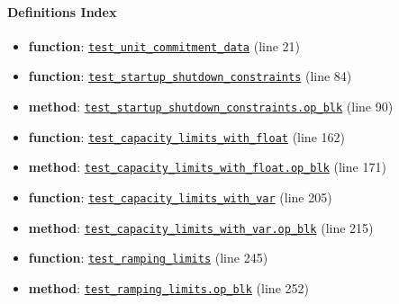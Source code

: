 \documentclass[11pt]{report}
\begin{document}
\paragraph{Definitions Index}
\begin{itemize}[leftmargin=*]
  \item \textbf{function}: \hyperref[def:pricetaker-tests-test_unit_commitment.py:test_unit_commitment_data:L21]{\texttt{test\_unit\_commitment\_data}} (line 21)
  \item \textbf{function}: \hyperref[def:pricetaker-tests-test_unit_commitment.py:test_startup_shutdown_constraints:L84]{\texttt{test\_startup\_shutdown\_constraints}} (line 84)
  \item \textbf{method}: \hyperref[def:pricetaker-tests-test_unit_commitment.py:test_startup_shutdown_constraints.op_blk:L90]{\texttt{test\_startup\_shutdown\_constraints.op\_blk}} (line 90)
  \item \textbf{function}: \hyperref[def:pricetaker-tests-test_unit_commitment.py:test_capacity_limits_with_float:L162]{\texttt{test\_capacity\_limits\_with\_float}} (line 162)
  \item \textbf{method}: \hyperref[def:pricetaker-tests-test_unit_commitment.py:test_capacity_limits_with_float.op_blk:L171]{\texttt{test\_capacity\_limits\_with\_float.op\_blk}} (line 171)
  \item \textbf{function}: \hyperref[def:pricetaker-tests-test_unit_commitment.py:test_capacity_limits_with_var:L205]{\texttt{test\_capacity\_limits\_with\_var}} (line 205)
  \item \textbf{method}: \hyperref[def:pricetaker-tests-test_unit_commitment.py:test_capacity_limits_with_var.op_blk:L215]{\texttt{test\_capacity\_limits\_with\_var.op\_blk}} (line 215)
  \item \textbf{function}: \hyperref[def:pricetaker-tests-test_unit_commitment.py:test_ramping_limits:L245]{\texttt{test\_ramping\_limits}} (line 245)
  \item \textbf{method}: \hyperref[def:pricetaker-tests-test_unit_commitment.py:test_ramping_limits.op_blk:L252]{\texttt{test\_ramping\_limits.op\_blk}} (line 252)
\end{itemize}
\end{document}
